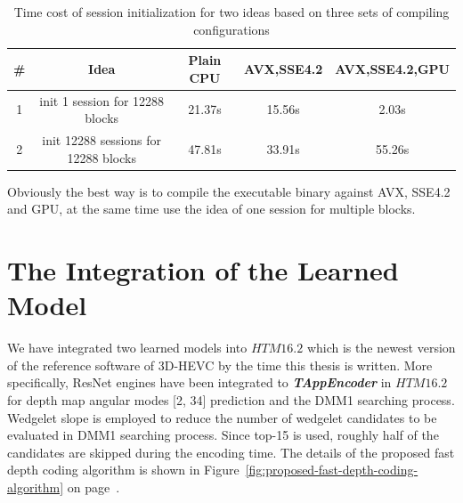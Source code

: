 \begin{table}
    \caption{Time cost of session initialization for two ideas based on three sets of compiling configurations}
    \bigskip\label{tab:seesion-init-plain-cpu}
    \centering
    \begin{tabular}{c c c c c}
        \toprule
        \# & Idea & Plain CPU & AVX,SSE4.2 & AVX,SSE4.2,GPU \\
        \midrule
        1 & init 1 session for 12288 blocks & 21.37s &15.56s&2.03s \\
        2 & init 12288 sessions for 12288 blocks & 47.81s &33.91s&55.26s\\
        \bottomrule
    \end{tabular}
\end{table}

Obviously the best way is to compile the 
executable binary against AVX, SSE4.2 and GPU, at the same
time use the idea of one session for multiple blocks.

\section{The Integration of the Learned Model}\label{sec:integration-of-learned-model}
We have integrated two learned models into 
\(HTM16.2\) which is the newest version of
the reference software of 3D-HEVC by the time this thesis
is written\@.
More specifically, ResNet engines have been integrated to 
\textbf{\textit{TAppEncoder}} in \(HTM16.2\) for depth map 
angular modes [2, 34] prediction and the DMM1 searching process.
Wedgelet slope is employed
to reduce the number of wedgelet candidates to be evaluated in DMM1 
searching process. 
Since top-15 is used, roughly half of the candidates are skipped
during the encoding time.
The details of the proposed fast depth coding algorithm is shown 
in Figure~\ref{fig:proposed-fast-depth-coding-algorithm}
on page~\pageref{fig:proposed-fast-depth-coding-algorithm}.

